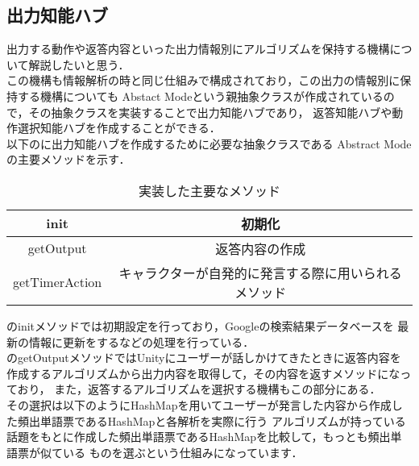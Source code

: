 

\subsection{出力知能ハブ}
出力する動作や返答内容といった出力情報別にアルゴリズムを保持する機構について解説したいと思う．\\

この機構も情報解析の時と同じ仕組みで構成されており，この出力の情報別に保持する機構についても
Abstact Modeという親抽象クラスが作成されているので，その抽象クラスを実装することで出力知能ハブであり，
返答知能ハブや動作選択知能ハブを作成することができる．
\\
以下のに出力知能ハブを作成するために必要な抽象クラスである
Abstract Modeの主要メソッドを示す．\\

\begin{table}[tbh]
	\caption{実装した主要なメソッド} \label{tab:abstractmode}
	\begin{center}
		\begin{tabular}[htb]{c|c}
		\hline
		init & 初期化 \\
		\hline
		getOutput & 返答内容の作成 \\
		\hline
		getTimerAction & キャラクターが自発的に発言する際に用いられるメソッド \\
		\hline
		\end{tabular}
	\end{center}
\end{table}

のinitメソッドでは初期設定を行っており，Googleの検索結果データベースを
最新の情報に更新をするなどの処理を行っている．
\\
のgetOutputメソッドではUnityにユーザーが話しかけてきたときに返答内容を
作成するアルゴリズムから出力内容を取得して，その内容を返すメソッドになっており，
また，返答するアルゴリズムを選択する機構もこの部分にある．
\\
その選択は以下のようにHashMapを用いてユーザーが発言した内容から作成した頻出単語票であるHashMapと各解析を実際に行う
アルゴリズムが持っている話題をもとに作成した頻出単語票であるHashMapを比較して，もっとも頻出単語票が似ている
ものを選ぶという仕組みになっています．\\


